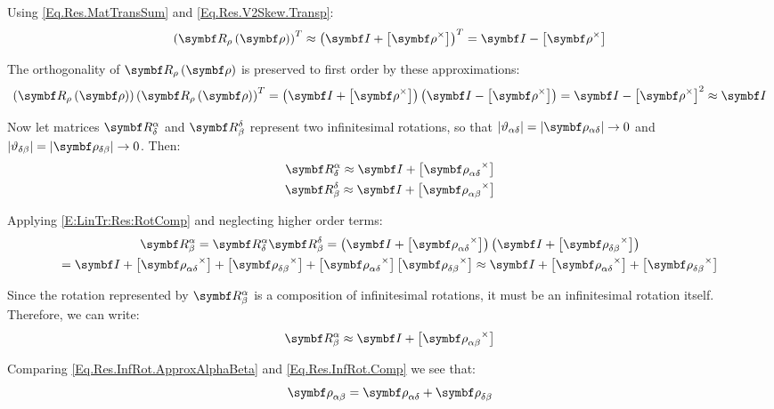 Using \eqref{Eq.Res.MatTransSum} and \eqref{Eq.Res.V2Skew.Transp}:
\begin{equation} \label{Eq.Res.InfRot.ApproxTr}
	\trp{\RotMRotV{\mcol{\rotvecsymb}}} \approx \trp{\IdM + \vskew{\mcol{\rotvecsymb}}} = \IdM -  \vskew{\mcol{\rotvecsymb}}
\end{equation}

The orthogonality of $\RotMRotV{\mcol{\rotvecsymb}}$ is preserved to first order by these approximations:
\begin{equation*}
	\rndp{\RotMRotV{\mcol{\rotvecsymb}}} \trp{\RotMRotV{\mcol{\rotvecsymb}}} = \rndp{\IdM + \vskew{\mcol{\rotvecsymb}}} \rndp{\IdM - \vskew{\mcol{\rotvecsymb}}} = \IdM - {\vskew{\mcol{\rotvecsymb}}}^2 \approx \IdM
\end{equation*}

Now let matrices $\RotM{\alpha}{\delta}$ and $\RotM{\delta}{\beta}$ represent two infinitesimal rotations, so that $|\rel{\rotang}{\alpha}{\delta}| = \normrotv{\alpha}{\delta} \to 0$ and $|\rel{\rotang}{\delta}{\beta}| = \normrotv{\delta}{\beta} \to 0$. Then:
\begin{gather*}
	\RotM{\alpha}{\delta} \approx \IdM + \vskew{\rotv{\alpha}{\delta}} \\
	\RotM{\delta}{\beta} \approx \IdM + \vskew{\rotv{\alpha}{\beta}}
\end{gather*}

Applying \eqref{E:LinTr:Res:RotComp} and neglecting higher order terms:
\begin{multline}
	\RotM{\alpha}{\beta} = \RotM{\alpha}{\delta} \RotM{\delta}{\beta} = \left( \IdM + \vskew{\rotv{\alpha}{\delta}} \right) \left( \IdM + \vskew{\rotv{\delta}{\beta}} \right)
	\\= \IdM + \vskew{\rotv{\alpha}{\delta}} + \vskew{\rotv{\delta}{\beta}} + \vskew{\rotv{\alpha}{\delta}} \vskew{\rotv{\delta}{\beta}} \approx \IdM + \vskew{\rotv{\alpha}{\delta}} + \vskew{\rotv{\delta}{\beta}} \label{Eq.Res.InfRot.Comp}
\end{multline}

Since the rotation represented by $\RotM{\alpha}{\beta}$ is a composition of infinitesimal rotations, it must be an infinitesimal rotation itself. Therefore, we can write:
\begin{equation} \label{Eq.Res.InfRot.ApproxAlphaBeta}
	\RotM{\alpha}{\beta} \approx \IdM + \vskew{\rotv{\alpha}{\beta}}
\end{equation}

Comparing \eqref{Eq.Res.InfRot.ApproxAlphaBeta} and \eqref{Eq.Res.InfRot.Comp} we see that:
\begin{equation*}
	\rotv{\alpha}{\beta} = \rotv{\alpha}{\delta} + \rotv{\delta}{\beta}
\end{equation*}

